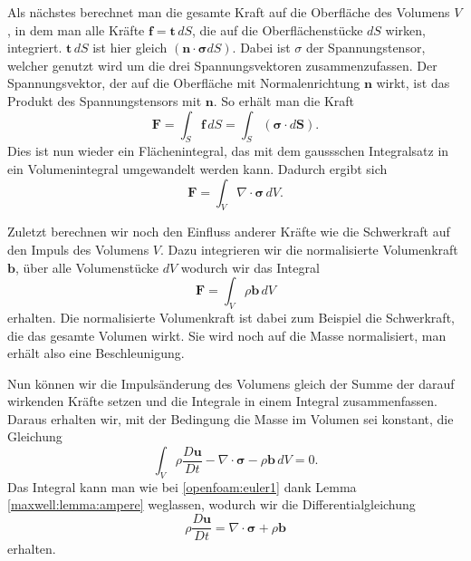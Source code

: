Als nächstes berechnet man die gesamte Kraft auf die Oberfläche des
Volumens $V$, in dem man alle Kräfte $\mathbf{f} = \mathbf{t}\,dS$,
die auf die Oberflächenstücke $dS$ wirken, integriert.
$\mathbf{t}\, dS$ ist hier gleich $(\mathbf{n\cdot\sigma}dS)$.
Dabei ist $\sigma$ der Spannungstensor, welcher genutzt wird um die drei Spannungsvektoren zusammenzufassen.
%
Der Spannungsvektor, der auf die Oberfläche mit Normalenrichtung $\mathbf{n}$ wirkt, ist das Produkt des Spannungstensors mit $\mathbf{n}$.
So erhält man die Kraft 
\[\mathbf{F} 
=
\int_{S}\mathbf{f}\, dS
= \int_{S} (\mathbf{\sigma}\cdot d\mathbf{S})
.\]
Dies ist nun wieder ein Flächenintegral, das mit dem gaussschen Integralsatz in ein Volumenintegral umgewandelt werden kann.
%
%
Dadurch ergibt sich
\[\mathbf{F} 
=
\int_{V}\nabla \cdot \mathbf{\sigma}\, dV
.\]

Zuletzt berechnen wir noch den Einfluss anderer Kräfte wie die Schwerkraft auf den Impuls des Volumens $V$.
Dazu integrieren wir die normalisierte Volumenkraft $\mathbf{b}$, über alle Volumenstücke $dV$ wodurch wir das Integral 
\[\mathbf{F} 
=
\int_{V}\rho\mathbf{b}\, dV
\]
erhalten.
Die normalisierte Volumenkraft ist dabei zum Beispiel die Schwerkraft, die das gesamte Volumen wirkt. 
Sie wird noch auf die Masse normalisiert, man erhält also eine Beschleunigung.

Nun können wir die Impulsänderung des Volumens gleich der Summe der darauf wirkenden Kräfte setzen und die Integrale in einem Integral zusammenfassen. Daraus erhalten wir, mit der Bedingung die Masse im Volumen sei konstant, die Gleichung 
\[\int_{V} \rho \frac{D\mathbf{u}}{Dt} - \nabla \cdot \mathbf{\sigma} -\rho \mathbf{b}\, dV
=
0.
\]
Das Integral kann man wie bei \eqref{openfoam:euler1} dank Lemma \ref{maxwell:lemma:ampere} weglassen, wodurch wir die Differentialgleichung
\begin{equation}
\label{openfoam:euler2_1}
\rho \frac{D\mathbf{u}}{Dt}
= 
\nabla \cdot \mathbf{\sigma} +\rho \mathbf{b}
\end{equation}
erhalten.


